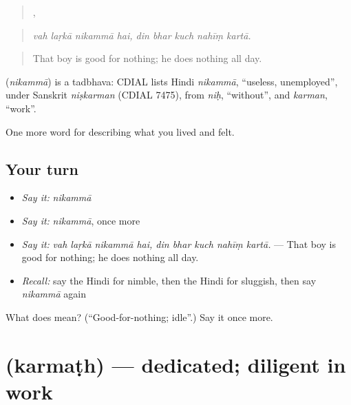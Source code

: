 \begin{quote}
   ,     
\end{quote}

\begin{quote}
\emph{vah laṛkā nikammā hai, din bhar kuch nahīṃ kartā.}
\end{quote}

\begin{quote}
That boy is good for nothing; he does nothing all day.
\end{quote}

\begin{cousinweb}
\textbf{} (\emph{nikammā}) is a tadbhava: CDIAL lists Hindi \emph{nikammā}, \textquotedblleft{}useless, unemployed\textquotedblright{}, under Sanskrit \emph{niṣkarman} (CDIAL 7475), from \emph{niḥ}, \textquotedblleft{}without\textquotedblright{}, and \emph{karman}, \textquotedblleft{}work\textquotedblright{}.
\end{cousinweb}

\begin{grammarlens}[title={What you've built}]
One more word for describing what you lived and felt.
\end{grammarlens}

\subsection*{Your turn}
\begin{itemize}
\raggedright
  \item \emph{Say it:} \emph{nikammā}
  \item \emph{Say it:} \emph{nikammā}, once more
  \item \emph{Say it:} \emph{vah laṛkā nikammā hai, din bhar kuch nahīṃ kartā.} — That boy is good for nothing; he does nothing all day.
  \item \emph{Recall:} say the Hindi for nimble, then the Hindi for sluggish, then say \emph{nikammā} again
\end{itemize}

\begin{tcolorbox}[breakable,colback=teal!4,colframe=teal!35!black,title={Before you move on}]
What does  mean? (\textquotedblleft{}Good-for-nothing; idle\textquotedblright{}.) Say it once more.
\end{tcolorbox}
\section[\texorpdfstring{\hi{कर्मठ} (karmaṭh)}{कर्मठ (karmaṭh)}]{ (karmaṭh) — dedicated; diligent in work}

